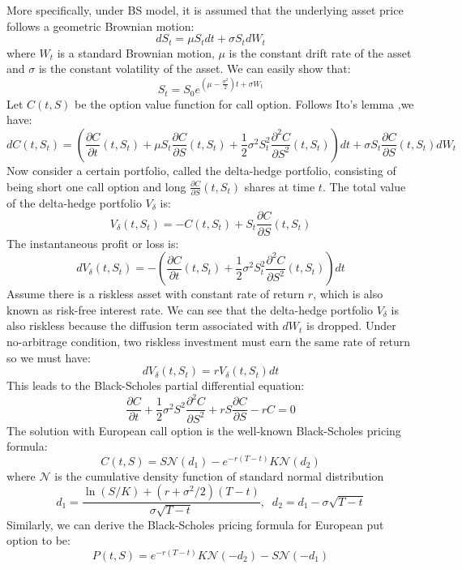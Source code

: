\documentclass[letterpaper,12pt,titlepage,oneside,final]{book}
\numberwithin{equation}{section}
\theoremstyle{definition}
\begin{document}
More specifically, under BS model, it is assumed that the underlying asset price follows a geometric Brownian motion:
\[
dS_t=\mu S_t dt+\sigma S_t dW_t
\]
where $W_t$ is a standard Brownian motion, $\mu$ is the constant drift rate of  the asset and $\sigma$ is the constant volatility of the asset. We can easily show that:
\[
S_t=S_0 e^{(\mu-\frac{\sigma^2}{2})t+\sigma W_t}
\]
Let $C(t,S)$ be the option value function for call option. Follows Ito's lemma \cite{shreve2004stochastic},we have:
\[
dC(t,S_t)=\left(\frac{\partial C}{\partial t}(t,S_t)+\mu S_t \frac{\partial C}{\partial S}(t,S_t)+\frac{1}{2} \sigma^2 S_t^2 \frac{\partial ^2 C}{ \partial S^2}(t,S_t)\right) dt+\sigma S_t \frac{\partial C}{\partial S}(t,S_t) dW_t
\]
 Now consider a certain portfolio, called the delta-hedge portfolio, consisting of being short one call option and long $\frac{\partial C}{\partial S}(t,S_t)$ shares at time $t$.
The total value of the delta-hedge portfolio $V_{\delta}$ is:
\[
V_{\delta}(t,S_t)=-C(t,S_t)+S_t \frac{\partial C}{\partial S}(t,S_t)
\]
The instantaneous profit or loss is:
\[
dV_{\delta}(t,S_t)=-\left(\frac{\partial C}{ \partial t}(t,S_t) +\frac{1}{2} \sigma^2 S_t^2 \frac{\partial^2 C}{ \partial S^2 }(t,S_t) \right) dt
\]
Assume there is a riskless asset with constant rate of return $r$, which is also known as risk-free interest rate. We can see that the delta-hedge portfolio $V_{\delta}$ is also riskless because the diffusion term associated with $dW_t$ is dropped. Under no-arbitrage condition, two riskless investment must earn the same rate of return so we must have:
\[
dV_{\delta}(t,S_t)=rV_{\delta}(t,S_t)dt
\]
This leads to the Black-Scholes partial differential equation:
\begin{equation}
\frac{\partial C}{\partial t}+\frac{1}{2}\sigma^2 S^2 \frac{\partial^2 C}{\partial S^2}+rS \frac{\partial C}{\partial S}-rC=0
\label{eq:bspde}
\end{equation}
The solution with European call option  is the well-known Black-Scholes pricing formula:
\begin{equation}
C(t,S)=S  \mathcal{N}(d_1)-e^{-r(T-t)}  K  \mathcal{N}(d_2)
\label{eq:bs}
\end{equation}
where $\mathcal{N}$ is the cumulative density function of standard normal distribution
\[
d_1=\frac{\ln(S/K)+(r+\sigma^2/2)(T-t)}{\sigma \sqrt{T-t}}, \;\; d_2=d_1-\sigma  \sqrt{T-t}
\]
Similarly, we can derive the Black-Scholes pricing formula for  European put option to be:
\begin{equation}
P(t,S)=e^{-r(T-t)}  K   \mathcal{N}(-d_2)-S  \mathcal{N}(-d_1)
\label{eq:bsP}
\end{equation}
\end{document}
